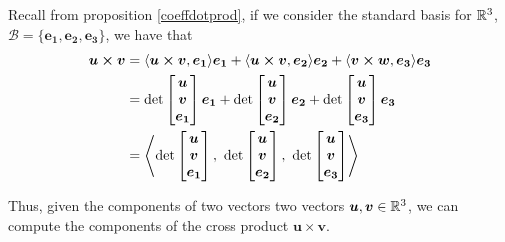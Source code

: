 Recall from proposition \ref{coeffdotprod}, if we consider the standard basis for $\mathbb{R}^3$, $\mathscr{B} = \{ \bm{e_1}, \bm{e_2},\bm{e_3}\}$, we have that 
\begin{align*}
        \bm{u \times v} &= \langle \bm{u \times v}, \bm{e_1} \rangle \bm{e_1} + \langle \bm{u \times v}, \bm{e_2} \rangle \bm{e_2} + \langle \bm{v \times w}, \bm{e_3} \rangle \bm{e_3} \\
        &= \textnormal{det}
\begin{bmatrix}
\bm{u}\\
    \bm{v}  \\
    \bm{e_1}
\end{bmatrix}\bm{e_1} + \textnormal{det}
\begin{bmatrix}
\bm{u}\\
    \bm{v}  \\
    \bm{e_2}
\end{bmatrix}\bm{e_2} + \textnormal{det}
\begin{bmatrix}
\bm{u}\\
    \bm{v}  \\
    \bm{e_3}
\end{bmatrix}\bm{e_3} \\
    &= 
    \left\langle\textnormal{det}
\begin{bmatrix}
\bm{u}\\
    \bm{v}  \\
    \bm{e_1}
\end{bmatrix}, \  \textnormal{det}
\begin{bmatrix}
\bm{u}\\
    \bm{v}  \\
    \bm{e_2}
\end{bmatrix}, \ \textnormal{det}
\begin{bmatrix}
\bm{u}\\
    \bm{v}  \\
    \bm{e_3}
\end{bmatrix} \right\rangle
    \end{align*}

Thus, given the components of two vectors two vectors $\bm{u}, \bm{v} \in \mathbb{R}^3$, we can compute the components of the cross product $\bm{u \times v}$.

